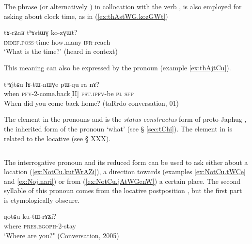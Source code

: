 The phrase  (or alternatively ) in collocation with the verb , is also employed for asking about clock time, as in (\ref{ex:thAstWG.kozGWt})

 \begin{exe}
\ex \label{ex:thAstWG.kozGWt}
 \gll   tɤ-rʑaʁ 	tʰɤstɯɣ ko-zɣɯt? \\
  \textsc{indef.poss}-time how.many  \textsc{ifr}-reach \\
  \glt `What is the time?' (heard in context)
  \end{exe} 
  
This meaning can also be expressed by the pronoun   (example \ref{ex:thAjtCu}).

\begin{exe}
\ex \label{ex:thAjtCu}
\gll  tʰɤjtɕu 	lɤ-tɯ-nɯɣe 	pɯ-ŋu 	ra 	nɤ?    \\
 when \textsc{pfv}-2-come.back[II] \textsc{pst.ipfv}-be \textsc{pl} \textsc{sfp} \\
\glt  When did you come back home? (taRrdo conversation, 01)
\end{exe} 

The element  in the pronouns   and  is the \textit{status constructus} form of proto-Japhug , the inherited form of the pronoun `what' (see § \ref{sec:tChi}). The element  in  is related to the locative  (see § XXX).

\subsection{} \label{sec:NotCu}

The interrogative pronoun  and its reduced form  can be used to ask either about a location (\ref{ex:NotCu.kutWrAZi}), a direction towards (examples \ref{ex:NotCu.tWCe} and \ref{ex:Noj.nari}) or from (\ref{ex:NotCu.jAtWGenW}) a certain place. The second syllable of this pronoun  comes from the locative postposition , but the first part is etymologically obscure.
 
\begin{exe}
\ex \label{ex:NotCu.kutWrAZi}
\gll     ŋotɕu ku-tɯ-rɤʑi?   \\
  where \textsc{pres.egoph}-2-stay \\
\glt `Where are you?" (Conversation, 2005)
\end{exe} 

